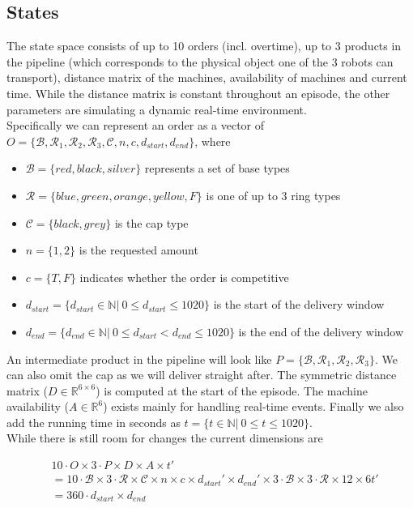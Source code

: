 \documentclass[runningheads,envcountsect]{llncs}
\begin{document}
\subsection{States} \label{states}
The state space consists of up to 10 orders (incl. overtime), up to 3 products in the pipeline (which corresponds to the physical object one of the 3 robots can transport), distance matrix of the machines, availability of machines and current time. While the distance matrix is constant throughout an episode, the other parameters are simulating a dynamic real-time environment.\\
Specifically we can represent an order as a vector of $O=\{\mathcal{B}, \mathcal{R}_1, \mathcal{R}_2, \mathcal{R}_3, \mathcal{C}, n, c, d_{start}, d_{end}  \}$, where
\begin{itemize}
  \item $\mathcal{B}=\{red, black, silver\}$ represents a set of base types
  \item $\mathcal{R}=\{blue, green, orange, yellow, F\}$ is one of up to 3 ring types
  \item $\mathcal{C}=\{black, grey\}$ is the cap type
  \item $n = \{1,2\}$ is the requested amount
  \item $c = \{T, F\}$ indicates whether the order is competitive
  \item $d_{start} = \{d_{start} \in \mathbb{N}|\ 0 \leq d_{start} \leq 1020 \}$ is the start of the delivery window
  \item $d_{end} = \{d_{end} \in \mathbb{N}|\ 0 \leq d_{start} < d_{end} \leq 1020 \}$ is the end of the delivery window
\end{itemize}
An intermediate product in the pipeline will look like $P=\{\mathcal{B}, \mathcal{R}_1, \mathcal{R}_2, \mathcal{R}_3\}$. We can also omit the cap as we will deliver straight after.
The symmetric distance matrix ($D \in \mathbb{R}^{6 \times 6}$) is computed at the start of the episode. 
The machine availability ($A \in \mathbb{R}^6$) exists mainly for handling real-time events.
Finally we also add the running time in seconds as $t = \{t \in \mathbb{N}|\ 0 \leq t \leq 1020 \}$.\\

While there is still room for changes the current dimensions are

\begin{align*}
&10 \cdot O \times 
3 \cdot P \times 
D \times
A \times
t' \\
&= 10 \cdot 
\mathcal{B} \times 
3 \cdot \mathcal{R} \times 
\mathcal{C} \times 
n \times 
c \times 
d_{start}' \times 
d_{end}' \times 
3 \cdot 
\mathcal{B} \times
3 \cdot \mathcal{R} \times 
12 \times
6
t' \\
&= 360 \cdot d_{start} \times d_{end}
\end{align*}
\end{document}
